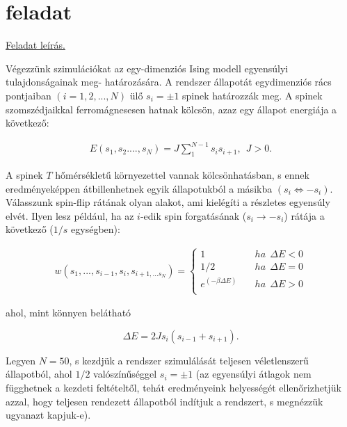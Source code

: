 \documentclass[a4paper, 12pt]{article}
\numberwithin{equation}{section}          %
\numberwithin{figure}{subsection}
\begin{document}
\newpage
\section{feladat}

\begin{center}
\underline{Feladat leírás.}
\end{center}
Végezzünk szimulációkat az egy-dimenziós Ising modell egyensúlyi tulajdonságainak meg-
határozására. A rendszer állapotát egydimenziós rács pontjaiban $(i = 1, 2, ..., N )$ ülő $s_i = \pm 1$
spinek határozzák meg. A spinek szomszédjaikkal ferromágnesesen hatnak kölcsön, azaz egy
állapot energiája a következő:

\begin{center}
	\begin{gather}
		E(s_1,s_2....,s_N) = J \sum_{1}^{N-1}s_is_{i+1}, \  \ J>0.
	\end{gather}
\end{center}

A spinek $T$ hőmérsékletű környezettel vannak kölcsönhatásban, s ennek eredményeképpen
átbillenhetnek egyik állapotukból a másikba $(s_i \Leftrightarrow -s_i )$.
Válasszunk spin-flip rátának olyan alakot, ami kielégíti a részletes egyensúly elvét. Ilyen
lesz például, ha az $i$-edik spin forgatásának ($s_i \rightarrow -s_i $) rátája a következő ($1/s$ egységben):

\begin{center}
	\begin{gather}
	w(s_1,...,s_{i-1},s_i,s_{i+1,...s_N}) =
	\begin{cases}
	1       & \quad ha\ \ \Delta E < 0\\
	1/2     & \quad ha\ \ \Delta E = 0 \\
	e^{(-\beta \Delta E)}  & \quad ha\ \ \Delta E > 0 \\
	\end{cases}        
	\end{gather}
\end{center}
ahol, mint könnyen belátható
\begin{center}
	\begin{equation}
\Delta E = 2Js_i(s_{i-1} + s_{i+1}).
	\end{equation}
\end{center}

Legyen $N = 50$, s kezdjük a rendszer szimulálását teljesen véletlenszerű állapotból, ahol
$1/2$ valószínűséggel $s_i = \pm 1$ (az egyensúlyi átlagok nem függhetnek a kezdeti feltételtől, tehát
eredményeink helyességét ellenőrizhetjük azzal, hogy teljesen rendezett állapotból indítjuk a
rendszert, s megnézzük ugyanazt kapjuk-e).
\end{document}
